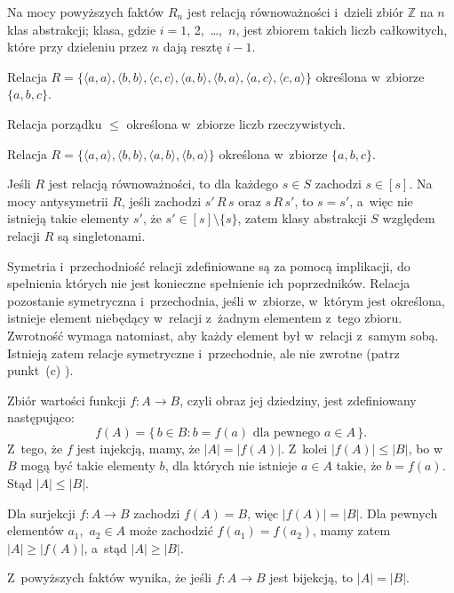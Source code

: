 Na mocy powyższych faktów $R_n$ jest relacją równoważności i~dzieli zbiór $\mathbb{Z}$ na $n$ klas abstrakcji;  klasa, gdzie $i=1$, 2,~\dots,~$n$, jest zbiorem takich liczb całkowitych, które przy dzieleniu przez $n$ dają resztę $i-1$.

\exercise %
\subexercise
Relacja $R=\bigl\{\langle a,a\rangle,\langle b,b\rangle,\langle c,c\rangle,\langle a,b\rangle,\langle b,a\rangle,\langle a,c\rangle,\langle c,a\rangle\bigr\}$ określona w~zbiorze $\{a,b,c\}$.

\subexercise
Relacja porządku $\le$ określona w~zbiorze liczb rzeczywistych.

\subexercise
Relacja $R=\bigl\{\langle a,a\rangle,\langle b,b\rangle,\langle a,b\rangle,\langle b,a\rangle\bigr\}$ określona w~zbiorze $\{a,b,c\}$.

\exercise %
Jeśli $R$ jest relacją równoważności, to dla każdego $s\in S$ zachodzi $s\in[s]$. Na mocy antysymetrii $R$, jeśli zachodzi $s'\,R\,s$ oraz $s\,R\,s'$, to $s=s'$, a~więc nie istnieją takie elementy $s'$, że $s'\in[s]\setminus\{s\}$, zatem klasy abstrakcji $S$ względem relacji $R$ są singletonami.

\exercise %
Symetria i~przechodniość relacji zdefiniowane są za pomocą implikacji, do spełnienia których nie jest konieczne spełnienie ich poprzedników. Relacja pozostanie symetryczna i~przechodnia, jeśli w~zbiorze, w~którym jest określona, istnieje element niebędący w~relacji z~żadnym elementem z~tego zbioru. Zwrotność wymaga natomiast, aby każdy element był w~relacji z~samym sobą. Istnieją zatem relacje symetryczne i~przechodnie, ale nie zwrotne (patrz punkt~(c) ).


\exercise %
\subexercise
Zbiór wartości funkcji $f\colon A\to B$, czyli obraz jej dziedziny, jest zdefiniowany następująco:
\[
	f(A) = \bigl\{\,b\in B:b=f(a)\text{ dla pewnego $a\in A$}\,\bigr\}.
\]
Z~tego, że $f$ jest injekcją, mamy, że $|A|=|f(A)|$. Z~kolei $|f(A)|\le|B|$, bo w~$B$ mogą być takie elementy $b$, dla których nie istnieje $a\in A$ takie, że $b=f(a)$. Stąd $|A|\le|B|$.

\subexercise
Dla surjekcji $f\colon A\to B$ zachodzi $f(A)=B$, więc $|f(A)|=|B|$. Dla pewnych elementów $a_1$,~$a_2\in A$ może zachodzić $f(a_1)=f(a_2)$, mamy zatem $|A|\ge|f(A)|$, a~stąd $|A|\ge|B|$.
\bigskip

\noindent Z~powyższych faktów wynika, że jeśli $f\colon A\to B$ jest bijekcją, to $|A|=|B|$.

